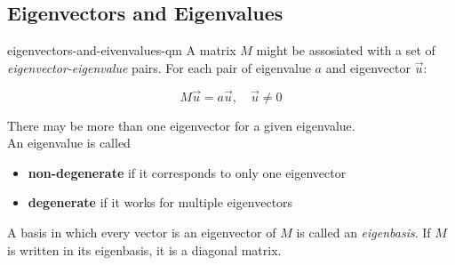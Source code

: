 \documentclass[preview]{standalone}
\begin{document}
\subsection{Eigenvectors and Eigenvalues}

\begin{snippet}{eigenvectors-and-eivenvalues-qm}
    A matrix \(M\) might be assosiated with a set of \textit{eigenvector-eigenvalue} pairs.
    For each pair of eigenvalue \(a\) and eigenvector \(\vec{u}\):

    \[
        M\vec{u}=a\vec{u},
        \quad\vec{u}\neq 0
    \]

    There may be more than one eigenvector for a given eigenvalue. \\
    An eigenvalue is called
    \begin{itemize}
        \item \textbf{non-degenerate} if it corresponds to only one eigenvector
        \item \textbf{degenerate} if it works for multiple eigenvectors
    \end{itemize}

    A basis in which every vector is an eigenvector of \(M\) is called an \textit{eigenbasis}.
    If \(M\) is written in its eigenbasis, it is a diagonal matrix.
\end{snippet}

\end{document}
